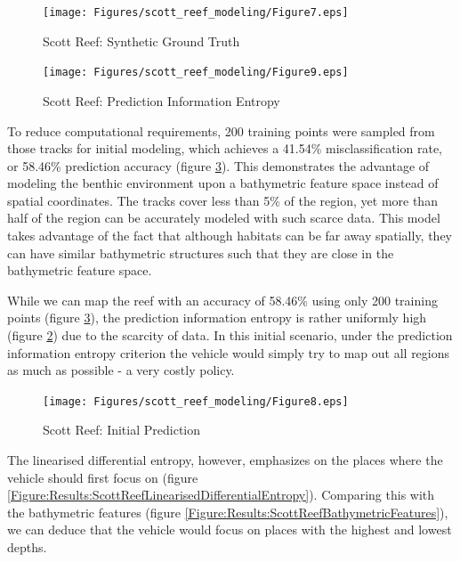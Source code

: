 \documentclass{article}
\begin{document}
		\begin{figure}[t]
		\fontsize{24}{12}\selectfont
		\centering
			\texttt{[image: Figures/scott\_reef\_modeling/Figure7.eps]}
		\caption{Scott Reef: Synthetic Ground Truth}
		\label{Figure:Results:ScottReefSyntheticGroundTruth}
		\end{figure}
		
		\begin{figure}[bp]
		\centering
			\texttt{[image: Figures/scott\_reef\_modeling/Figure9.eps]}
		\caption{Scott Reef: Prediction Information Entropy}
		\label{Figure:Results:ScottReefPredictionInformationEntropy}
		\end{figure}
				
		To reduce computational requirements, 200 training points were sampled from those tracks for initial modeling, which achieves a 41.54\% misclassification rate, or 58.46\% prediction accuracy (figure \ref{Figure:Results:ScottReefInitialPredictions}). This demonstrates the advantage of modeling the benthic environment upon a bathymetric feature space instead of spatial coordinates. The tracks cover less than 5\% of the region, yet more than half of the region can be accurately modeled with such scarce data. This model takes advantage of the fact that although habitats can be far away spatially, they can have similar bathymetric structures such that they are close in the bathymetric feature space.

		While we can map the reef with an accuracy of 58.46\% using only 200 training points (figure \ref{Figure:Results:ScottReefInitialPredictions}), the prediction information entropy is rather uniformly high (figure \ref{Figure:Results:ScottReefPredictionInformationEntropy}) due to the scarcity of data. In this initial scenario, under the prediction information entropy criterion the vehicle would simply try to map out all regions as much as possible - a very costly policy.
		
		\begin{figure}[t]
		\centering
			\texttt{[image: Figures/scott\_reef\_modeling/Figure8.eps]}
		\caption{Scott Reef: Initial Prediction}
		\label{Figure:Results:ScottReefInitialPredictions}
		\end{figure}
					
		The linearised differential entropy, however, emphasizes on the places where the vehicle should first focus on (figure \ref{Figure:Results:ScottReefLinearisedDifferentialEntropy}). Comparing this with the bathymetric features (figure \ref{Figure:Results:ScottReefBathymetricFeatures}), we can deduce that the vehicle would focus on places with the highest and lowest depths.
		
\end{document}

